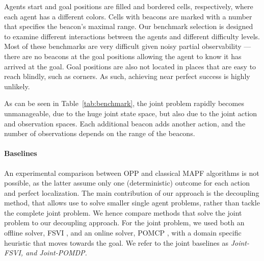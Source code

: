 \documentclass[letterpaper]{article} %
\newcommand{\guy}[1]{\textcolor{blue}{[Guy: #1]}}
\begin{document}
Agents start and goal positions are filled and bordered cells, respectively, where each agent has a different colors. Cells with beacons are marked with a number that specifies the beacon's maximal range.  
Our benchmark selection is designed to examine different interactions between the agents and different difficulty levels.
Most of these benchmarks are very difficult given noisy partial observability --- there are no beacons at the goal positions allowing the agent to know it has arrived at the goal. Goal positions are also not located in places that are easy to reach blindly, such as corners. As such, achieving near perfect success is highly unlikely.

As can be seen in Table~\ref{tab:benchmark}, the joint problem rapidly becomes unmanageable, due to the huge joint state space, but also due to the joint action and observation spaces. Each additional beacon adds another action, and the number of observations depends on the range of the beacons.


\paragraph{Baselines}



An experimental comparison between OPP and classical MAPF algorithms is not possible, as the latter assume only one (deterministic) outcome for each action and perfect localization. 
The main contribution of our approach is the decoupling method, that allows use to solve smaller single agent problems, rather than tackle the complete joint problem. We hence compare methods that solve the joint problem to our decoupling approach. For the joint problem, we used both an offline solver, FSVI \cite{shani2013survey}, and an online solver, POMCP \cite{silver2010monte}, with a domain specific heuristic that moves towards the goal. We refer to the joint baselines as \em{Joint-FSVI}, and \em{Joint-POMDP}. %
\end{document}
